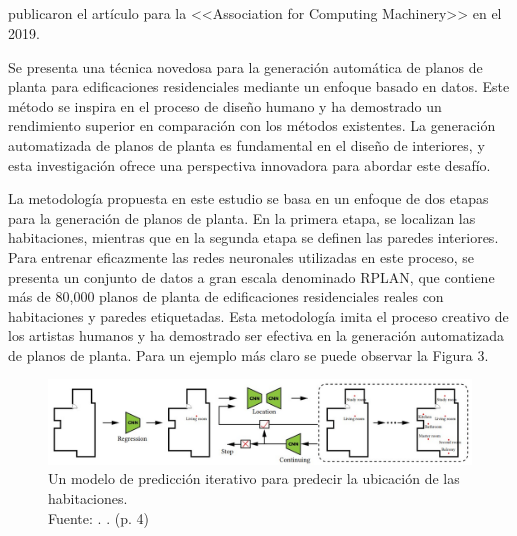 \subsection{}

\cite{art_wu2019interior} publicaron el artículo   para la <<Association for Computing Machinery>> en el 2019.

Se presenta una técnica novedosa para la generación automática de planos de planta para edificaciones residenciales mediante un enfoque basado en datos. Este método se inspira en el proceso de diseño humano y ha demostrado un rendimiento superior en comparación con los métodos existentes. La generación automatizada de planos de planta es fundamental en el diseño de interiores, y esta investigación ofrece una perspectiva innovadora para abordar este desafío.

La metodología propuesta en este estudio se basa en un enfoque de dos etapas para la generación de planos de planta. En la primera etapa, se localizan las habitaciones, mientras que en la segunda etapa se definen las paredes interiores. Para entrenar eficazmente las redes neuronales utilizadas en este proceso, se presenta un conjunto de datos a gran escala denominado RPLAN, que contiene más de 80,000 planos de planta de edificaciones residenciales reales con habitaciones y paredes etiquetadas. Esta metodología imita el proceso creativo de los artistas humanos y ha demostrado ser efectiva en la generación automatizada de planos de planta. Para un ejemplo más claro se puede observar la Figura 3.

\begin{figure}[!ht]
	\begin{center}
		\includegraphics[width=1\textwidth]{2/figures/wu2019.jpg}
		\caption[Un modelo de predicción iterativo para predecir la ubicación de las habitaciones]{Un modelo de predicción iterativo para predecir la ubicación de las habitaciones.\\
			Fuente: \cite{art_wu2019interior}. . (p. 4)}
		\label{2:fig111}
	\end{center}
\end{figure}

